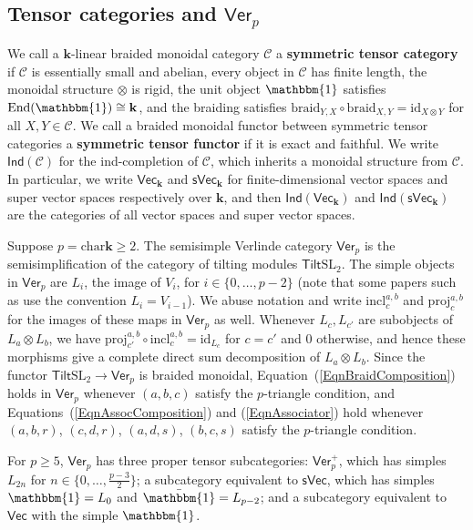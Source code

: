 \documentclass[11pt,a4paper,reqno]{amsart}
\theoremstyle{definition}
\newcommand{\bk}{\mathbf{k}}
\newcommand{\cC}{\mathcal{C}}
\numberwithin{equation}{section}
\newcommand{\braid}{\mathrm{braid}}
\newcommand{\charr}{\mathrm{char}}
\newcommand{\Ver}{\mathsf{Ver}}
\newcommand{\unit}{{\mathbbm{1}}}
\newcommand{\End}{\mathrm{End}}
\newcommand{\id}{\mathrm{id}}
\newcommand{\Vecc}{\mathsf{Vec}}
\newcommand{\sVec}{\mathsf{sVec}}
\newcommand{\Indd}{\mathsf{Ind}}
\newcommand{\Tilt}{\mathsf{Tilt}}
\newcommand{\SL}{\mathrm{SL}}
\newcommand{\incl}{\mathrm{incl}}
\newcommand{\proj}{\mathrm{proj}}
\begin{document}
\subsection{Tensor categories and $\Ver_p$} We call a $\bk$-linear braided monoidal category $\cC$ a \textbf{symmetric tensor category} if $\cC$ is essentially small and abelian, every object in $\cC$ has finite length, the monoidal structure $\otimes$ is rigid, the unit object $\unit$ satisfies $\End(\unit)\cong\bk$, and the braiding satisfies $\braid_{Y,X}\circ\braid_{X,Y}=\id_{X\otimes Y}$ for all $X,Y\in\cC$. We call a braided monoidal functor between symmetric tensor categories a \textbf{symmetric tensor functor} if it is exact and faithful. We write $\Indd(\cC)$ for the ind-completion of $\cC$, which inherits a monoidal structure from $\cC$. In particular, we write $\Vecc_\bk$ and $\sVec_\bk$ for finite-dimensional vector spaces and super vector spaces respectively over $\bk$, and then $\Indd(\Vecc_\bk)$ and $\Indd(\sVec_\bk)$ are the categories of all vector spaces and super vector spaces.

Suppose $p=\charr\bk\geq2$. The semisimple Verlinde category $\Ver_p$ is the semisimplification of the category of tilting modules $\Tilt\SL_2$. The simple objects in $\Ver_p$ are $L_i$, the image of $V_i$, for $i\in\{0,\dots,p-2\}$ (note that some papers such as \cite{asymptotic} use the convention $L_i=V_{i-1}$). We abuse notation and write $\incl^{a,b}_c$ and $\proj^{a,b}_c$ for the images of these maps in $\Ver_p$ as well. Whenever $L_c,L_{c'}$ are subobjects of $L_a\otimes L_b$, we have $\proj_{c'}^{a,b}\circ\incl_c^{a,b}=\id_{L_c}$ for $c=c'$ and 0 otherwise, and hence these morphisms give a complete direct sum decomposition of $L_a\otimes L_b$. Since the functor $\Tilt\SL_2\to\Ver_p$ is braided monoidal, Equation~(\ref{EqnBraidComposition}) holds in $\Ver_p$ whenever $(a,b,c)$ satisfy the $p$-triangle condition, and Equations~(\ref{EqnAssocComposition}) and (\ref{EqnAssociator}) hold whenever $(a,b,r)$, $(c,d,r)$, $(a,d,s)$, $(b,c,s)$ satisfy the $p$-triangle condition.

For $p\geq5$, $\Ver_p$ has three proper tensor subcategories: $\Ver_p^+$, which has simples $L_{2n}$ for $n\in\{0,\dots,\frac{p-3}2\}$; a subcategory equivalent to $\sVec$, which has simples $\unit=L_0$ and $\bar\unit=L_{p-2}$; and a subcategory equivalent to $\Vecc$ with the simple $\unit$.
\end{document}
